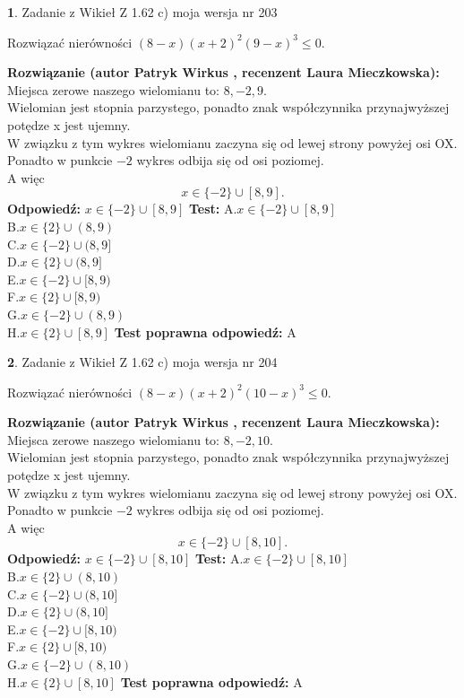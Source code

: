 \documentclass[12pt, a4paper]{article}
\theoremstyle{definition} %
\newtheorem{zad}{}
\newcommand{\zadStart}[1]{\begin{zad}#1\newline}
\newcommand{\zadStop}{\end{zad}}
\newcommand{\rozwStart}[2]{\noindent \textbf{Rozwiązanie (autor #1 , recenzent #2): }\newline}
\newcommand{\rozwStop}{\newline}
\newcommand{\odpStart}{\noindent \textbf{Odpowiedź:}\newline}
\newcommand{\odpStop}{\newline}
\newcommand{\testStart}{\noindent \textbf{Test:}\newline}
\newcommand{\testStop}{\newline}
\newcommand{\kluczStart}{\noindent \textbf{Test poprawna odpowiedź:}\newline}
\newcommand{\kluczStop}{\newline}
\begin{document}
\zadStart{Zadanie z Wikieł Z 1.62 c) moja wersja nr 203}

Rozwiązać nierówności $(8-x)(x+2)^{2}(9-x)^{3}\le0$.
\zadStop
\rozwStart{Patryk Wirkus}{Laura Mieczkowska}
Miejsca zerowe naszego wielomianu to: $8, -2, 9$.\\
Wielomian jest stopnia parzystego, ponadto znak współczynnika przy\linebreak najwyższej potędze x jest ujemny.\\ W związku z tym wykres wielomianu zaczyna się od lewej strony powyżej osi OX.\\
Ponadto w punkcie $-2$ wykres odbija się od osi poziomej.\\
A więc $$x \in \{-2\} \cup [8,9].$$
\rozwStop
\odpStart
$x \in \{-2\} \cup [8,9]$
\odpStop
\testStart
A.$x \in \{-2\} \cup [8,9]$\\
B.$x \in \{2\} \cup (8,9)$\\
C.$x \in \{-2\} \cup (8,9]$\\
D.$x \in \{2\} \cup (8,9]$\\
E.$x \in \{-2\} \cup [8,9)$\\
F.$x \in \{2\} \cup [8,9)$\\
G.$x \in \{-2\} \cup (8,9)$\\
H.$x \in \{2\} \cup [8,9]$
\testStop
\kluczStart
A
\kluczStop



\zadStart{Zadanie z Wikieł Z 1.62 c) moja wersja nr 204}

Rozwiązać nierówności $(8-x)(x+2)^{2}(10-x)^{3}\le0$.
\zadStop
\rozwStart{Patryk Wirkus}{Laura Mieczkowska}
Miejsca zerowe naszego wielomianu to: $8, -2, 10$.\\
Wielomian jest stopnia parzystego, ponadto znak współczynnika przy\linebreak najwyższej potędze x jest ujemny.\\ W związku z tym wykres wielomianu zaczyna się od lewej strony powyżej osi OX.\\
Ponadto w punkcie $-2$ wykres odbija się od osi poziomej.\\
A więc $$x \in \{-2\} \cup [8,10].$$
\rozwStop
\odpStart
$x \in \{-2\} \cup [8,10]$
\odpStop
\testStart
A.$x \in \{-2\} \cup [8,10]$\\
B.$x \in \{2\} \cup (8,10)$\\
C.$x \in \{-2\} \cup (8,10]$\\
D.$x \in \{2\} \cup (8,10]$\\
E.$x \in \{-2\} \cup [8,10)$\\
F.$x \in \{2\} \cup [8,10)$\\
G.$x \in \{-2\} \cup (8,10)$\\
H.$x \in \{2\} \cup [8,10]$
\testStop
\kluczStart
A
\kluczStop
\end{document}
